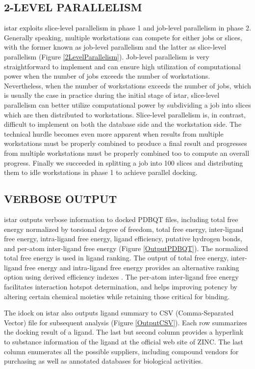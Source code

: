 \documentclass[12pt]{article}
\begin{document}
\subsection*{\sffamily \large 2-LEVEL PARALLELISM}

istar exploits slice-level parallelism in phase 1 and job-level parallelism in phase 2. Generally speaking, multiple workstations can compete for either jobs or slices, with the former known as job-level parallelism and the latter as slice-level parallelism (Figure \ref{2LevelParallelism}). Job-level parallelism is very straightforward to implement and can ensure high utilization of computational power when the number of jobs exceeds the number of workstations. Nevertheless, when the number of workstations exceeds the number of jobs, which is usually the case in practice during the initial stage of istar, slice-level parallelism can better utilize computational power by subdividing a job into slices which are then distributed to workstations. Slice-level parallelism is, in contrast, difficult to implement on both the database side and the workstation side. The technical hurdle becomes even more apparent when results from multiple workstations must be properly combined to produce a final result and progresses from multiple workstations must be properly combined too to compute an overall progress. Finally we succeeded in splitting a job into 100 slices and distributing them to idle workstations in phase 1 to achieve parallel docking.

\subsection*{\sffamily \large VERBOSE OUTPUT}

istar outputs verbose information to docked PDBQT files, including total free energy normalized by torsional degree of freedom, total free energy, inter-ligand free energy, intra-ligand free energy, ligand efficiency, putative hydrogen bonds, and per-atom inter-ligand free energy (Figure \ref{OutputPDBQT}). The normalized total free energy is used in ligand ranking. The output of total free energy, inter-ligand free energy and intra-ligand free energy provides an alternative ranking option using derived efficiency indexes \citep{335,336,337}. The per-atom inter-ligand free energy facilitates interaction hotspot determination, and helps improving potency by altering certain chemical moieties while retaining those critical for binding.

The idock on istar also outputs ligand summary to CSV (Comma-Separated Vector) file for subsequent analysis (Figure \ref{OutputCSV}). Each row summarizes the docking result of a ligand. The last but second column provides a hyperlink to substance information of the ligand at the official web site of ZINC. The last column enumerates all the possible suppliers, including compound vendors for purchasing as well as annotated databases for biological activities.
\end{document}
